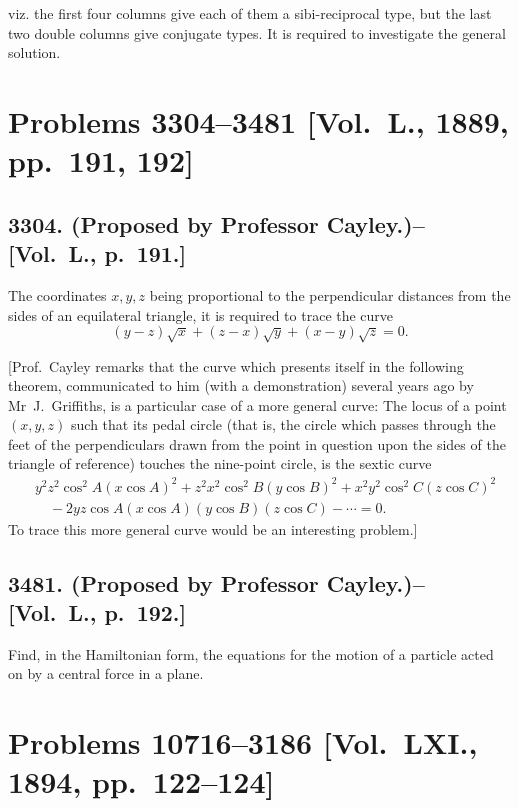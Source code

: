 \documentclass[11pt,a4paper]{book}
\begin{document}
viz. the first four columns give each of them a sibi-reciprocal type, but the last two double columns give conjugate types. It is required to investigate the general solution.

\newpage

\section*{Problems 3304--3481 [Vol.~L., 1889, pp.~191, 192]}

\subsection*{3304. (Proposed by Professor Cayley.)\---[Vol.~L., p.~191.]}

The coordinates $x,y,z$ being proportional to the perpendicular distances from the sides of an equilateral triangle, it is required to trace the curve
\[
(y-z)\sqrt{x} + (z-x)\sqrt{y} + (x-y)\sqrt{z} = 0.
\]

[Prof.~Cayley remarks that the curve which presents itself in the following theorem, communicated to him (with a demonstration) several years ago by Mr~J.~Griffiths, is a particular case of a more general curve: The locus of a point $(x,y,z)$ such that its pedal circle (that is, the circle which passes through the feet of the perpendiculars drawn from the point in question upon the sides of the triangle of reference) touches the nine-point circle, is the sextic curve
\[
\begin{aligned}
&y^2z^2\cos^2A(x\cos A)^2 + z^2x^2\cos^2B(y\cos B)^2 + x^2y^2\cos^2C(z\cos C)^2 \\
&\quad - 2yz\cos A(x\cos A)(y\cos B)(z\cos C) - \cdots = 0.
\end{aligned}
\]
To trace this more general curve would be an interesting problem.]

\subsection*{3481. (Proposed by Professor Cayley.)\---[Vol.~L., p.~192.]}

Find, in the Hamiltonian form, the equations for the motion of a particle acted on by a central force in a plane.

\newpage

\section*{Problems 10716--3186 [Vol.~LXI., 1894, pp.~122--124]}
\end{document}
